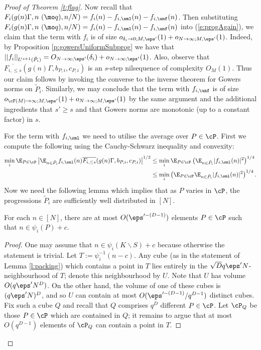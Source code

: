 \begin{proof}[Proof of Theorem \ref{t:flag}]
Now recall that $F_i( g(n) \Gamma, n\ (\mo q), n/N) =  f_i(n) -  f_{i,\sml}(n) -  f_{i,\unf}(n)$. Then substituting $F_i( g(n) \Gamma, n\ (\mo q), n/N) =  f_i(n) -  f_{i,\sml}(n) -  f_{i,\unf}(n)$ into (\ref{e:progAgain}), we claim that the term with $f_i$ is of size $o_{\delta_i\to 0;M,\eps'}(1)+ o_{N\to \infty;M,\eps'}(1)$. Indeed, by Proposition \ref{p:gowersUniformSubprog} we have that $||f_i||_{U^{s+1}(\tilde P_i)} = O_{N\to \infty;\eps'}(\delta_i)+ o_{N\to \infty;\eps'}(1)$. Also, observe that $\overline{F_{i,\leq s}}( g(n) \Gamma, b_{P,i},c_{P,i})$ is an $s$-step nilsequence of complexity $O_M(1)$.  Thus our claim follows by invoking the converse to the inverse theorem for Gowers norms on $\tilde P_i$. Similarly, we may conclude that the term with $ f_{i,\unf}$ is of size $o_{\cF(M) \to \infty; M, \eps'}(1) + o_{N\to \infty;M,\eps'}(1)$ by the same argument and the additional ingredients that $s' \geq s$ and that Gowers norms are monotonic (up to a constant factor) in $s$.

For the term with $f_{i,\sml}$ we need to utilise the average over $P \in \cP$. First we compute  the following using the Cauchy-Schwarz inequality and convexity: 
\begin{align*}
\min_i \E_{P \in \cP}\left|\E_{n\in \tilde P_i} f_{i,\sml}(n)\overline{F_{i,\leq s}}( g(n) \Gamma, b_{P,i},c_{P,i})\right|^{1/2} &\leq \min_i \E_{P \in \cP}\left(\E_{n\in \tilde  P_i} | f_{i,\sml}(n)|^2\right)^{1/4} \\
&\leq \min_i \left(\E_{P \in \cP}\E_{n\in \tilde P_i} | f_{i,\sml}(n)|^2\right)^{1/4}.
\end{align*}
Now we need the following lemma which implies that as $P$ varies in $\cP$, the progressions $\tilde P_i$ are sufficiently well distributed in $[N]$. 

\begin{lemma}\label{l:gtfix}
For each $n \in [N]$, there are at most $O(\eps'^{-(D-1)})$ elements $P \in \cP$ such that $n \in \psi_i(P) + c$.
\end{lemma}
\begin{proof}
One may assume that $n \in \psi_i(K \backslash S) + c$ because otherwise the statement is trivial. Let $T:=\psi_i^{-1}(n-c)$. 
 Any cube (as in the statement of Lemma \ref{l:packing}) which contains a point in $T$ lies entirely in the $\sqrt{D}q \eps'N$-neighbourhood of $T$; denote this neighbourhood by $U$. Note that $U$ has volume $O(q\eps' N^D)$. On the other hand, the volume of one of these cubes is $(q\eps'N)^D$, and so $U$ can contain at most $O(\eps'^{-(D-1)}/q^{D-1})$ distinct cubes. Fix such a cube $Q$ and recall that $Q$ comprises $q^{D}$ different $P \in \cP$. Let $\cP_Q$ be those $P\in \cP$ which are contained in $Q$; it remains to argue that at most $O(q^{D-1})$ elements of $\cP_Q$ can contain a point in $T$. 


\end{proof}
\end{proof}
